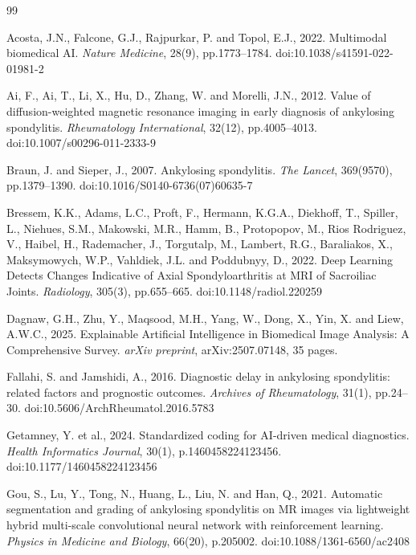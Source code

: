 \documentclass[12pt, a4paper]{article}
\begin{document}
\newpage
\begin{thebibliography}{99}

Acosta, J.N., Falcone, G.J., Rajpurkar, P. and Topol, E.J., 2022. Multimodal biomedical AI. \textit{Nature Medicine}, 28(9), pp.1773--1784. doi:10.1038/s41591-022-01981-2

Ai, F., Ai, T., Li, X., Hu, D., Zhang, W. and Morelli, J.N., 2012. Value of diffusion-weighted magnetic resonance imaging in early diagnosis of ankylosing spondylitis. \textit{Rheumatology International}, 32(12), pp.4005--4013. doi:10.1007/s00296-011-2333-9

Braun, J. and Sieper, J., 2007. Ankylosing spondylitis. \textit{The Lancet}, 369(9570), pp.1379--1390. doi:10.1016/S0140-6736(07)60635-7

Bressem, K.K., Adams, L.C., Proft, F., Hermann, K.G.A., Diekhoff, T., Spiller, L., Niehues, S.M., Makowski, M.R., Hamm, B., Protopopov, M., Rios Rodriguez, V., Haibel, H., Rademacher, J., Torgutalp, M., Lambert, R.G., Baraliakos, X., Maksymowych, W.P., Vahldiek, J.L. and Poddubnyy, D., 2022. Deep Learning Detects Changes Indicative of Axial Spondyloarthritis at MRI of Sacroiliac Joints. \textit{Radiology}, 305(3), pp.655--665. doi:10.1148/radiol.220259

Dagnaw, G.H., Zhu, Y., Maqsood, M.H., Yang, W., Dong, X., Yin, X. and Liew, A.W.C., 2025. Explainable Artificial Intelligence in Biomedical Image Analysis: A Comprehensive Survey. \textit{arXiv preprint}, arXiv:2507.07148, 35 pages.

Fallahi, S. and Jamshidi, A., 2016. Diagnostic delay in ankylosing spondylitis: related factors and prognostic outcomes. \textit{Archives of Rheumatology}, 31(1), pp.24--30. doi:10.5606/ArchRheumatol.2016.5783

Getamney, Y. et al., 2024. Standardized coding for AI-driven medical diagnostics. \textit{Health Informatics Journal}, 30(1), p.1460458224123456. doi:10.1177/1460458224123456


Gou, S., Lu, Y., Tong, N., Huang, L., Liu, N. and Han, Q., 2021. Automatic segmentation and grading of ankylosing spondylitis on MR images via lightweight hybrid multi-scale convolutional neural network with reinforcement learning. \textit{Physics in Medicine and Biology}, 66(20), p.205002. doi:10.1088/1361-6560/ac2408


\end{thebibliography}
\end{document}
